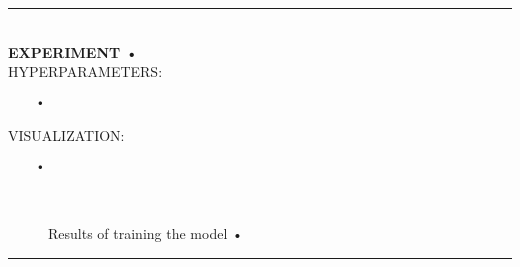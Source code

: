 \rule{0.5\textwidth}{0.5pt}\\

	{\large \textbf{EXPERIMENT •}}\\
	
	{\normalsize HYPERPARAMETERS:}
	\begin{lstlisting}	
	•
	\end{lstlisting}
	
	{\normalsize VISUALIZATION:}
	\begin{lstlisting}
	•
	\end{lstlisting}
	
	\begin{figure*}[ht!]
		\hspace{\fill}
		\hspace{\fill}
		\\
		\caption{Results of training the model •}
	\end{figure*}
	
	
\rule{0.5\textwidth}{0.5pt}\\